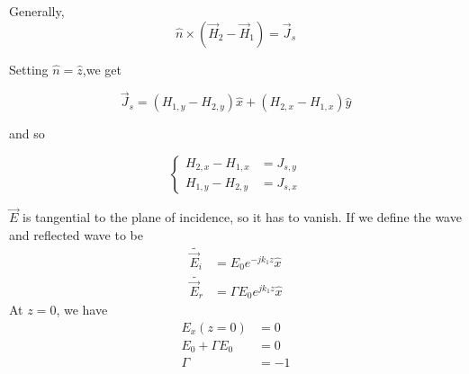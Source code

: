 \documentclass[12pt]{article}
\begin{document}
Generally,
$$\hat n \times (\vec H_2 - \vec H_1) = \vec J_s$$

Setting $\hat n = \hat z$,we get

$$\vec J_s = (H_{1,y} - H_{2,y})\hat x + (H_{2,x} - H_{1,x})\hat y$$

and so

$$\begin{cases} H_{2,x} - H_{1,x} &= J_{s,y} \\ H_{1,y} - H_{2,y} &= J_{s,x}\end{cases}$$

\begin{ex}
    $\vec E$ is tangential to the plane of incidence, so it has to vanish. If we define the wave and reflected wave to be
    \begin{align*}
        \tilde{\vec E_i} &= E_0e^{-jk_1z} \hat x \\
        \tilde{\vec E_r} &= \Gamma E_0e^{jk_1z}\hat x
    \end{align*}
    At $z = 0$, we have
    \begin{align*}
        E_x(z=0) &= 0 \\
        E_0 + \Gamma E_0 &= 0 \\
        \Gamma &= -1
    \end{align*}
\end{ex}
\end{document}
